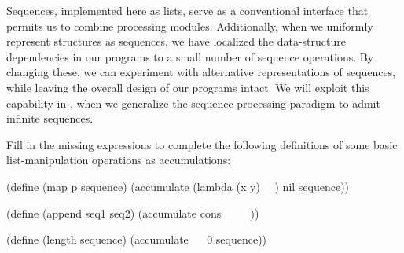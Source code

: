 Sequences, implemented here as lists, serve as a conventional interface that permits us to combine processing modules.
Additionally, when we uniformly represent structures as sequences, we have localized the data-structure dependencies in our programs to a small number of sequence operations.
By changing these, we can experiment with alternative representations of sequences, while leaving the overall design of our programs intact.
We will exploit this capability in , when we generalize the sequence-processing paradigm to admit infinite sequences.



\begin{exercise}
	\label{Exercise 2.33}
	Fill in the missing expressions to complete the following definitions of some basic list-manipulation operations as accumulations:
	\begin{scheme}
	  (define (map p sequence)
	    (accumulate (lambda (x y) ~~) nil sequence))

	  (define (append seq1 seq2)
	    (accumulate cons ~~ ~~))

	  (define (length sequence)
	    (accumulate ~~ 0 sequence))
	\end{scheme}
\end{exercise}



